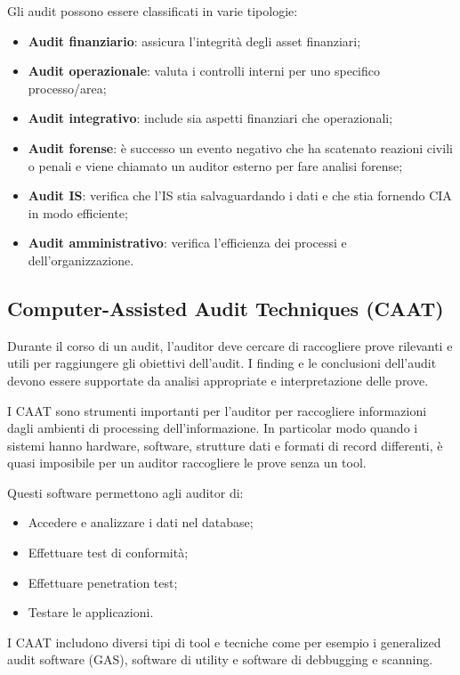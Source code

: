 Gli audit possono essere classificati in varie tipologie:
\begin{itemize}
\item \textbf{Audit finanziario}: assicura l'integrità degli asset
finanziari;
\item \textbf{Audit operazionale}: valuta i controlli interni per uno
specifico processo/area;
\item \textbf{Audit integrativo}: include sia aspetti finanziari
che operazionali;
\item \textbf{Audit forense}: è successo un evento negativo che ha
scatenato reazioni civili o penali e viene chiamato un auditor
esterno per fare analisi forense;
\item \textbf{Audit IS}: verifica che l'IS stia salvaguardando i dati
e che stia fornendo CIA in modo efficiente;
\item \textbf{Audit amministrativo}: verifica l'efficienza dei processi
e dell'organizzazione.
\end{itemize}


\subsection{Computer-Assisted Audit Techniques (CAAT)}
Durante il corso di un audit, l'auditor deve cercare di raccogliere
prove rilevanti e utili per raggiungere gli obiettivi dell'audit.
I finding e le conclusioni dell'audit devono essere supportate da 
analisi appropriate e interpretazione delle prove.

I CAAT sono strumenti importanti per l'auditor per raccogliere
informazioni dagli ambienti di processing dell'informazione.
In particolar modo quando i sistemi hanno hardware, software, strutture
dati e formati di record differenti, è quasi imposibile per un auditor
raccogliere le prove senza un tool.

Questi software permettono agli auditor di:
\begin{itemize}
\item Accedere e analizzare i dati nel database;
\item Effettuare test di conformità;
\item Effettuare penetration test;
\item Testare le applicazioni.
\end{itemize}

I CAAT includono diversi tipi di tool e tecniche come per esempio
i generalized audit software (GAS), software di utility e
software di debbugging e scanning.

